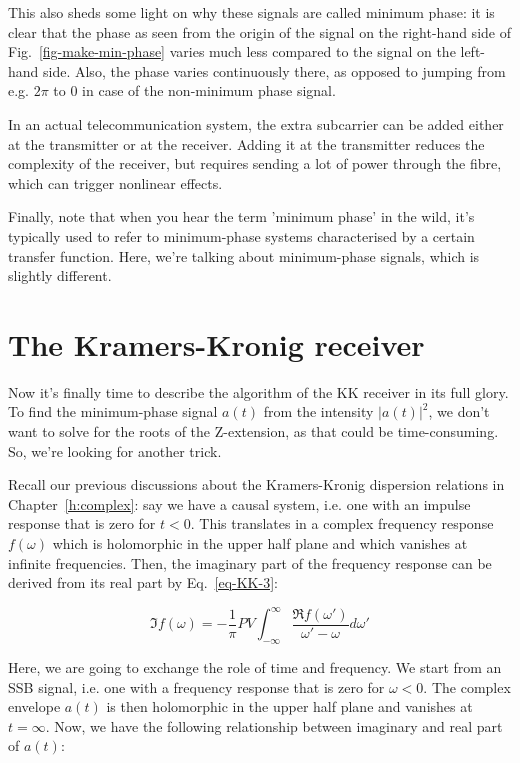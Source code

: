 This also sheds some light on why these signals are called minimum phase: it is clear that the phase as seen from the origin of the signal on the right-hand side of Fig.~\ref{fig-make-min-phase} varies much less compared to the signal on the left-hand side. Also, the phase varies continuously there, as opposed to jumping from e.g. $2 \pi$ to 0 in case of the non-minimum phase signal.

In an actual telecommunication system, the extra subcarrier can be added either at the transmitter or at the receiver. Adding it at the transmitter reduces the complexity of the receiver, but requires sending a lot of power through the fibre, which can trigger nonlinear effects.

Finally, note that when you hear the term 'minimum phase' in the wild, it's typically used to refer to minimum-phase systems characterised by a certain transfer function. Here, we're talking about minimum-phase signals, which is slightly different. 

\pagebreak

\section{The Kramers-Kronig receiver}

Now it's finally time to describe the algorithm of the KK receiver in its full glory. To find the minimum-phase signal $a(t)$ from the intensity $|a(t)|^2$, we don't want to solve for the roots of the Z-extension, as that could be time-consuming. So, we're looking for another trick.

Recall our previous discussions about the Kramers-Kronig dispersion relations in Chapter~\ref{h:complex}: say we have a causal system, i.e. one with an impulse response that is zero for $t<0$. This translates in a complex frequency response $f(\omega)$ which is holomorphic in the upper half plane and which vanishes at infinite frequencies. Then, the imaginary part of the frequency response can be derived from its real part by Eq.~\ref{eq-KK-3}:

\begin{equation}
\Im f(\omega) = -\frac{1}{\pi} PV \int_{- \infty}^{\infty} \frac{\Re
    f(\omega')}{\omega'-\omega}d\omega'
\end{equation} 

Here, we are going to exchange the role of time and frequency. We start from an SSB signal, i.e. one with a frequency response that is zero for $\omega<0$. The complex envelope $a(t)$ is then holomorphic in the upper half plane and vanishes at $t=\infty$. Now, we have the following relationship between imaginary and real part of $a(t)$:

